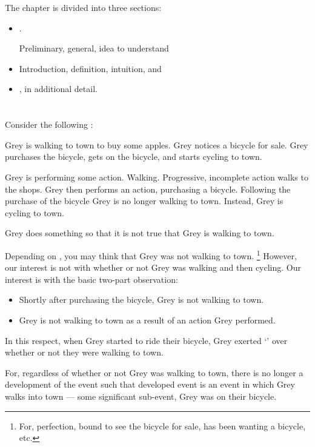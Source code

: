 \begin{note}
  The chapter is divided into three sections:
  \begin{itemize}
  \item

    \ninf{}.

    Preliminary, general, idea to understand 
  \item

    Introduction, definition, intuition, and 
  \item

    \tR{}, in additional detail.
  \end{itemize}
\end{note}

\section{}
\label{cha:requs:sec:infl}

\begin{note}
  Consider the following :

  \begin{scenario}[Apples]
    \label{scen:apples}
    Grey is walking to town to buy some apples.
    Grey notices a bicycle for sale.
    Grey purchases the bicycle, gets on the bicycle, and starts cycling to town.
  \end{scenario}

  Grey is performing some action.
  Walking.
  Progressive, incomplete action walks to the shops.
  Grey then performs an action, purchasing a bicycle.
  Following the purchase of the bicycle Grey is no longer walking to town.
  Instead, Grey is cycling to town.

  Grey does something so that it is not true that Grey is walking to town.

  Depending on , you may think that Grey was not walking to town.%
  \footnote{
    For, perfection, bound to see the bicycle for sale, has been wanting a bicycle, etc.
  }
  However, our interest is not with whether or not Grey was walking and then cycling.
  Our interest is with the basic two-part observation:
  \begin{itemize}[noitemsep]
  \item
    Shortly after purchasing the bicycle, Grey is not walking to town.
  \item
    Grey is not walking to town as a result of an action Grey performed.
  \end{itemize}

  In this respect, when Grey started to ride their bicycle, Grey exerted `\ninf{}' over whether or not they were walking to town.

  For, regardless of whether or not Grey was walking to town, there is no longer a development of the event such that developed event is an event in which Grey walks into town --- some significant sub-event, Grey was on their bicycle.
\end{note}

